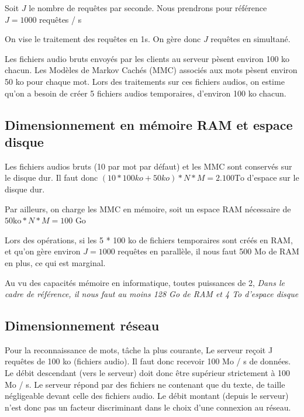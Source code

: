 \documentclass[a4paper,12pt]{report}
\begin{document}
\medskip{}

Soit $J$ le nombre de requêtes par seconde.
Nous prendrons pour référence $J = 1000$ requêtes / s

\smallskip{}

On vise le traitement des requêtes en 1s.
On gère donc $J$ requêtes en simultané.

\medskip{}

Les fichiers audio bruts envoyés par les clients au serveur pèsent environ 100 ko chacun.
Les Modèles de Markov Cachés (MMC) associés aux mots pèsent environ 50 ko pour chaque mot.
Lors des traitements sur ces fichiers audios, on estime qu'on a besoin de créer 5 fichiers audios temporaires, d'environ 100 ko chacun.

\subsection{Dimensionnement en mémoire RAM et espace disque}

Les fichiers audios bruts (10 par mot par défaut) et les MMC sont conservés sur le disque dur.
Il faut donc $(10 * 100 ko + 50 ko) * N * M = 2.100 \text{To}$ d'espace sur le disque dur.

Par ailleurs, on charge les MMC en mémoire, soit un espace RAM nécessaire de $50 \text{ko} * N * M = 100$ Go

Lors des opérations, si les 5 * 100 ko de fichiers temporaires sont créés en RAM, et qu'on gère environ $J = 1000$ requêtes en parallèle, il nous faut 500 Mo de RAM en plus, ce qui est marginal.

Au vu des capacités mémoire en informatique, toutes puissances de 2,
\emph{Dans le cadre de référence, il nous faut au moins 128 Go de RAM et 4 To d'espace disque}

\subsection{Dimensionnement réseau}

Pour la reconnaissance de mots, tâche la plus courante,
Le serveur reçoit J requêtes de 100 ko (fichiers audio). Il faut donc recevoir 100 Mo / s de données. Le débit descendant (vers le serveur) doit donc être supérieur strictement à 100 Mo / s.
Le serveur répond par des fichiers ne contenant que du texte, de taille négligeable devant celle des fichiers audio. Le débit montant (depuis le serveur) n'est donc pas un facteur discriminant dans le choix d'une connexion au réseau.
\end{document}
